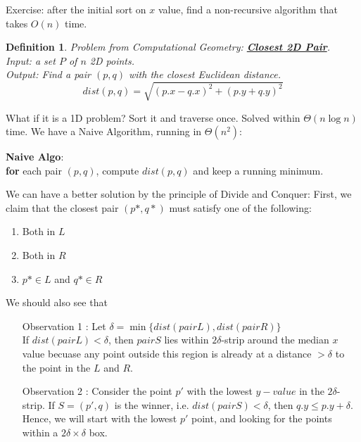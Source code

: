 \documentclass[twoside]{article}
\newcommand{\pc}[1]{\mbox{\textbf{#1}}} %
\newtheorem{protodefinition}[prototheorem]{Definition}
\newenvironment{definition}
{\colorlet{shadecolor}{cyan!15}\begin{shaded}\begin{protodefinition}\normalfont}
		{\end{protodefinition}\end{shaded}}
\begin{document}
Exercise: after the initial sort on $x$ value, find a non-recursive algorithm that takes $O(n)$ time. 
\begin{definition}
	Problem from Computational Geometry: \textbf{\underline{Closest 2D Pair}}. \\
	Input: a set $P$ of $n$ 2D points. \\
	Output: Find a pair $(p,q)$ with the closest Euclidean distance. $$dist(p,q) = \sqrt{(p.x-q.x)^2 + (p.y+q.y)^2}$$
\end{definition}
What if it is a 1D problem? Sort it and traverse once. Solved within $\Theta(n\log n)$ time. 
We have a Naive Algorithm, running in $\Theta(n^2)$: 
\begin{algorithme}
	\textbf{Naive Algo}: \\
	\>\pc{for} each pair $(p,q)$, compute $dist(p,q)$ and keep a running minimum. 
\end{algorithme}
We can have a better solution by the principle of Divide and Conquer: First, we claim that the closest pair $(p*, q*)$ must satisfy one of the following: \begin{enumerate}
\item Both in $L$
\item Both in $R$
\item $p* \in L$ and $q* \in R$ 
\end{enumerate}
We should also see that 
\begin{enumerate}
	\item [Observation 1]: Let $\delta = \min \{dist(pairL), dist(pairR)\}$\\
	      If $dist(pairL) < \delta$, then $pairS$ lies within $2\delta$-strip around the median $x$ value becuase any point outside this region is already at a distance $>\delta$ to the point in the $L$ and $R$. 
	\item [Observation 2]: Consider the point $p'$ with the lowest $y-value$ in the $2\delta$-strip. If $S = (p', q)$ is the winner, i.e. $dist(pairS) < \delta$, then $q.y \leq p.y + \delta$. Hence, we will start with the lowest $p'$ point, and looking for the points within a $2\delta \times \delta$ box. 
\end{enumerate}
\end{document}
